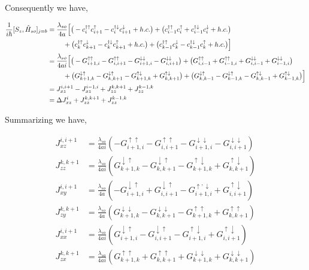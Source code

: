 \documentclass[10pt,prb,showpacs,amssymb,floatfix]{revtex4-1}
\newcommand{\dg}{\dagger}
\newcommand{\dna}{\downarrow}
\newcommand{\nn}{\nonumber}
\newcommand{\upa}{\uparrow}
\newcommand{\Dlt}{\Delta}
\newcommand{\h}{\hat}
\begin{document}
Consequently we have,

\begin{align}
\frac{1}{i\hbar}[S_z, \h H_{so}]_{j=b} &= \frac{\lambda_{so}}{4a} \Big{[}     \big{(} -  c_{i}^{\dg\upa}  c_{i+1}^{\uparrow}  -   c_{i}^{\dg\dna} c_{i+1}^{ \downarrow}   + h.c.    \big{)}    + \big{(}   c_{i-1 }^{\dagger \uparrow} c_{i}^{\upa}  +  c_{i-1}^{\dagger \downarrow} c_{i}^{\dna} + h.c.  \big{)}    \nn\\
& ~~~~~~~ + \big{(}  c_{k}^{\dg\upa}  c_{k+1}^{ \downarrow}    -   c_{k}^{\dg\dna} c_{k+1}^{ \uparrow}  + h.c.   \big{)}  +  \big{(}   c_{ k-1}^{\dagger \uparrow} c_{k}^{\dna} -  c_{k-1}^{\dagger \downarrow} c_{k}^{\upa}  + h.c.  \big{)}        \Big{]} \nn\\
&= \frac{\lambda_{so}}{4ai} \Big{[}     \big{(} -G_{i+1,i}^{\upa\upa}   - G_{i,i+1}^{\upa\upa}  -   G_{i+1,i}^{\dna\dna}   -  G_{i,i+1}^{\dna\dna}   \big{)}    + \big{(}    G_{i,i-1}^{\upa\upa} + G_{i-1,i}^{\upa\upa}  +  G_{i,i-1}^{\dna\dna}   + G_{i-1,i}^{\dna\dna}     \big{)}    \nn\\
& ~~~~~~~ + \big{(}  G_{k+1,k}^{\dna\upa}  - G_{k,k+1}^{\dna\upa}   -  G_{k+1,k}^{\upa\dna}    + G_{k,k+1}^{\upa\dna}   \big{)}  +  \big{(} G_{k,k-1}^{\dna\upa}  - G_{k-1,k}^{\dna\upa}   -  G_{k,k-1}^{\upa\dna} +  G_{k-1,k}^{\upa\dna}    \big{)}        \Big{]} \nn\\
&= J_{xz}^{i,i+1} - J_{xz}^{i-1,i} + J_{zz}^{k,k+1} + J_{zz}^{k-1,k} \nn\\
&= \Dlt J_{xz}^i + J_{zz}^{k,k+1} + J_{zz}^{k-1,k}
\end{align}

Summarizing we have,

\begin{align}
J_{xz}^{i,i+1} &= \frac{\lambda_{so}}{4ai} (-G_{i+1,i}^{\upa\upa}   - G_{i,i+1}^{\upa\upa}  -   G_{i+1,i}^{\dna\dna}   -  G_{i,i+1}^{\dna\dna})  \nn\\
J_{zz}^{k,k+1} &= \frac{\lambda_{so}}{4ai}  (G_{k+1,k}^{\dna\upa}  - G_{k,k+1}^{\dna\upa}   -  G_{k+1,k}^{\upa\dna}    + G_{k,k+1}^{\upa\dna})  \nn\\
J_{xy}^{i,i+1} &= \frac{\lambda_{so}}{4a}  (- G_{i+1,i}^{\dna\upa}   + G_{i,i+1}^{\dna\upa}   - G_{i+1,i}^{\upa,\dna}  +  G_{i,i+1}^{\upa\dna}) \nn\\
J_{zy}^{k,k+1} &= \frac{\lambda_{so}}{4a} (G_{k+1,k}^{\dna\dna} - G_{k,k+1}^{\dna\dna}   - G_{k+1,k}^{\upa\upa}    +  G_{k,k+1}^{\upa\upa}) \nn\\
J_{xx}^{i,i+1} &=   \frac{\lambda_{so}}{4ai} (G_{i+1,i}^{\dna\upa}  -  G_{i,i+1}^{\dna\upa}    -  G_{i+1,i}^{\upa\dna} + G_{i,i+1}^{\upa\dna}) \nn\\
J_{zx}^{k,k+1} &= \frac{\lambda_{so}}{4ai}  (G_{k+1,k}^{\upa\upa} + G_{k,k+1}^{\upa\upa} + G_{k+1,k}^{\dna\dna}  + G_{k,k+1}^{\dna\dna} )
\end{align}
\end{document}
